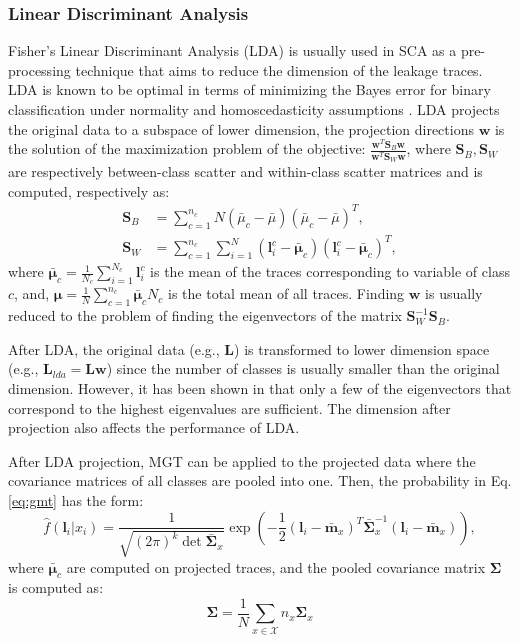 \documentclass{llncs}
\begin{document}
	\subsubsection*{Linear Discriminant Analysis}\label{ssec:lda}
	Fisher's Linear Discriminant Analysis (LDA) is usually used in SCA as a pre-processing technique that aims to reduce the dimension of the leakage traces. LDA is known to be optimal in terms of minimizing the Bayes error for binary classification under normality and homoscedasticity assumptions \cite{LDAKojo}. LDA projects the original data to a subspace of lower dimension, the projection directions $\mathbf{w}$ is the solution of the maximization problem of the objective: $\frac{\mathbf{w}^T \mathbf{S}_B \mathbf{w}}{\mathbf{w}^T \mathbf{S}_W \mathbf{w}}$, where $\mathbf{S}_B, \mathbf{S}_W$ are respectively between-class scatter and within-class scatter matrices and is computed, respectively as:
	\begin{align*}
		\bm{S}_B &= \sum_{c=1}^{n_c}N(\bar{\mu}_c - \bar{\mu})(\bar{\mu}_c - \bar{\mu})^T,\\
		\bm{S}_W &=\sum_{c=1}^{n_c}\sum_{i=1}^N(\bm{l}^c_i - \bar{\bm{\mu}}_c) (\bm{l}^c_i - \bar{\bm{\mu}}_c)^T,
	\end{align*}
	where $\bar{\mathbf{\mu}}_c = \frac{1}{N_c}\sum_{i=1}^{N_c}\bm{l}^c_i$ is the mean of the traces corresponding to variable of class $c$, and,  $\bm{\mu} = \frac{1}{N}\sum_{c=1}^{n_c}\bar{\bm{\mu}}_c N_c$ is the total mean of all traces. Finding $\bm{w}$ is usually reduced to the problem of finding the eigenvectors of the matrix $\bm{S}_W^{-1}\bm{S}_B$.
	
	After LDA, the original data (e.g., $\bm{L}$) is transformed to lower dimension space (e.g., $\bm{L}_{lda} = \bm{L} \bm{w}$) since the number of classes is usually smaller than the original dimension. However, it has been shown in that only a few of the eigenvectors that correspond to the highest eigenvalues are sufficient. The dimension after projection also affects the performance of LDA. 
	
	After LDA projection, MGT can be applied to the projected data where the covariance matrices of all classes are pooled into one. Then, the probability in Eq.\ref{eq:gmt} has the form:
	\begin{equation}\label{eq:gmt}
		\displaystyle	\hat{f}(\bm{l}_i|x_i) = \frac{1}{\sqrt{(2\pi)^k\det \bar{\bm{\Sigma}}_{x}}}\exp\left(  -\frac{1}{2}(\bm{l}_i - \bar{\bm{m}}_{x})^T\bar{\bm{\Sigma}}_{x}^{-1} (\bm{l}_i - \bar{\bm{m}}_{x})\right) , 
	\end{equation}
	where $\bar{\mathbf{\mu}}_c $ are computed on projected traces, and the pooled covariance matrix $\bm{\Sigma}$ is computed as:
	$$\bm{\Sigma} = \frac{1}{N}\sum_{x \in \mathcal{X}} n_x \bm{\Sigma}_x$$
\end{document}
